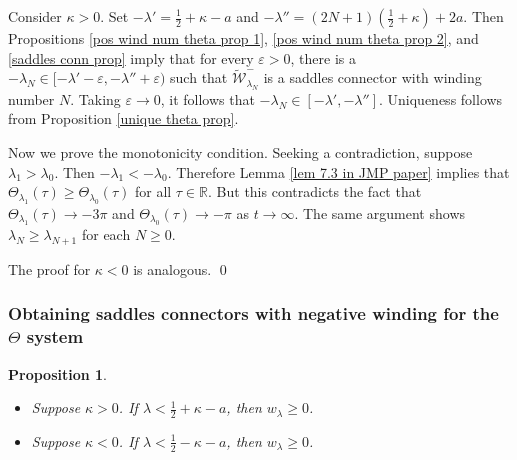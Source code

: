 \documentclass[11 pt]{article}
\newtheorem{prop}[thm]{Proposition}%
\renewcommand\l{\lambda}
\renewcommand\({\left(}
\renewcommand\){\right)}
\newcommand\wt{\widetilde}
\newcommand\e{\varepsilon}
\newcommand\<{\langle}
\renewcommand\>{\rangle}
\renewcommand\l{\lambda}
\newcommand\8{\infty}
\newcommand{\R}{\mathbb R}
\newcommand{\mc}{\mathcal}
\begin{document}
\proof
Consider $\kappa > 0$. Set $-\l' = \frac{1}{2} +\kappa - a$ and $-\l'' = (2N + 1)(\frac{1}{2} +\kappa) + 2a$. Then Propositions \ref{pos wind num theta prop 1}, \ref{pos wind num theta prop 2}, and \ref{saddles conn prop} imply that for every $\e > 0$, there is a $-\l_N \in [-\l' - \e, -\l'' + \e)$ such that $\wt{\mc{W}}^-_{\l_N}$ is a saddles connector with winding number $N$. Taking $\e \to 0$, it follows that  $-\l_N \in [-\l', -\l'']$. Uniqueness follows from Proposition \ref{unique theta prop}. 

Now we prove the monotonicity condition.  Seeking a contradiction, suppose $\l_1 > \l_0$. Then $-\l_1 < -\l_0$. Therefore Lemma \ref{lem 7.3 in JMP paper} implies that $\Theta_{\l_1}(\tau) \geq \Theta_{\l_0}(\tau)$ for all $\tau \in \R$. But this contradicts the fact that $\Theta_{\l_1}(\tau) \to - 3\pi$ and $\Theta_{\l_0}(\tau) \to -\pi$ as $t \to \infty$. The same argument shows $\l_N \geq \l_{N+1}$ for each $N \geq 0$. 

The proof for $\kappa < 0$ is analogous.
\qed



\medskip
\medskip

\subsubsection{Obtaining saddles connectors with negative winding for the $\Theta$ system}

\medskip
\medskip

\begin{prop}\label{neg wind num theta prop 1}\:  $\phantom{nix}$
\begin{itemize}
\item[$\bullet$] Suppose $\kappa > 0$. If $\l < \frac{1}{2} + \kappa - a$, then $w_\l \geq 0$.

\item[$\bullet$] Suppose $\kappa < 0$. If $\l < \frac{1}{2} - \kappa-a$, then $w_\l \geq 0$. 
\end{itemize}
\end{prop}
\end{document}
